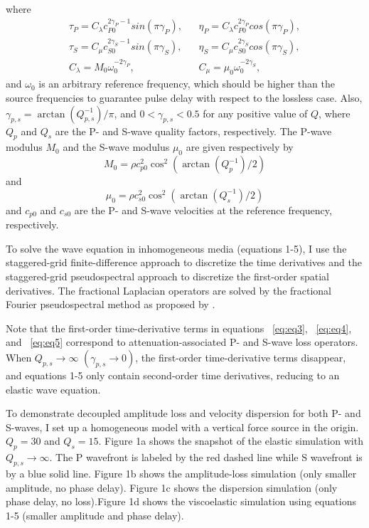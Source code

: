 where
\begin{eqnarray}
\label{eq:eq8}
\tau_P = C_{\lambda} c_{P0}^{2\gamma_P-1}sin(\pi\gamma_P ),&& \eta_P=C_\lambda c_{P0}^{2\gamma_P}cos(\pi\gamma_P ),\nonumber \\
\tau_S = C_\mu c_{S0}^{2\gamma_S-1}sin(\pi\gamma_S ),&& \eta_S=C_\mu c_{S0}^{2\gamma_S}cos(\pi\gamma_S ),\nonumber \\
C_{\lambda}=M_{0}\omega_0^{-2\gamma_P}, && C_\mu=\mu_{0}\omega_0^{-2\gamma_S},
\end{eqnarray}
and $\omega_0$ is an arbitrary reference frequency, which should be higher than the source frequencies to guarantee pulse delay with respect to the lossless case. Also, $\gamma_{p,s}=\arctan(Q_{p,s}^{-1})/\pi $, and $0<\gamma_{p,s}<0.5$ for any positive value of $Q$, where  $Q_p$ and $Q_s$ are the P- and S-wave quality factors, respectively. The P-wave modulus $M_0$ and the S-wave modulus $\mu_0$  are given respectively by 
\begin{equation} 
 M_0=\rho c_{p0}^2\cos^2(\arctan(Q_p^{-1})/2) \nonumber
 \end{equation}
 and
 \begin{equation}
 \mu_0=\rho c_{s0}^2\cos^2(\arctan(Q_s^{-1})/2) \nonumber
\end{equation}
and $c_{p0}$ and $c_{s0}$ are the P- and S-wave velocities at the reference frequency, respectively. 

To solve the wave equation in inhomogeneous media (equations 1-5), I use the staggered-grid finite-difference approach to discretize the time derivatives and the staggered-grid pseudospectral approach to discretize the first-order spatial derivatives. The fractional Laplacian operators are solved by the fractional Fourier pseudospectral method as proposed by \citet[]{zhu14a}. 

Note that the first-order time-derivative terms in equations ~\ref{eq:eq3}, ~\ref{eq:eq4}, and ~\ref{eq:eq5} correspond to attenuation-associated P- and S-wave loss operators. When $Q_{p,s}\rightarrow \infty$   $(\gamma_{p,s}\rightarrow 0)$, the first-order time-derivative terms disappear, and equations 1-5 only contain second-order time derivatives, reducing to an elastic wave equation. 

To demonstrate decoupled amplitude loss and velocity dispersion for both P- and S-waves, I set up a homogeneous model with a vertical force source in the origin. $Q_p=30$ and $Q_s=15$. Figure 1a shows the snapshot of the elastic simulation with $Q_{p,s}\rightarrow \infty$. The P wavefront is labeled by the red dashed line while S wavefront is by a blue solid line. Figure 1b shows the amplitude-loss simulation (only smaller amplitude, no phase delay). Figure 1c shows the dispersion simulation (only phase delay, no loss).Figure 1d shows the viscoelastic simulation using equations 1-5 (smaller amplitude and phase delay).

